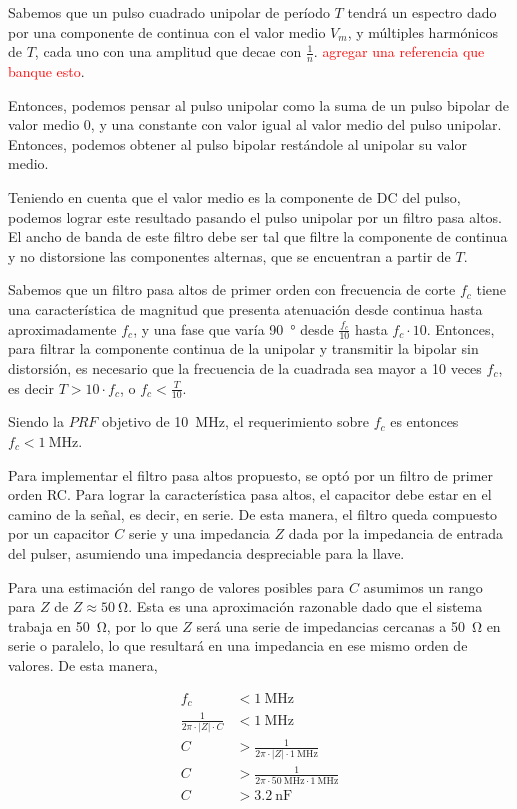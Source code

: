 Sabemos que un pulso cuadrado unipolar de período $T$ tendrá un espectro dado
por una componente de continua con el valor medio $V_{m}$, y múltiples
harmónicos de $T$, cada uno con una amplitud que decae con $\frac{1}{n}$.
\textcolor{red}{agregar una referencia que banque esto}.

Entonces, podemos pensar al pulso unipolar como la suma de un pulso bipolar de
valor medio 0, y una constante con valor igual al valor medio del pulso
unipolar. Entonces, podemos obtener al pulso bipolar restándole al unipolar su
valor medio.

Teniendo en cuenta que el valor medio es la componente de DC del pulso, podemos
lograr este resultado pasando el pulso unipolar por un filtro pasa altos. El ancho
de banda de este filtro debe ser tal que filtre la componente de continua y no
distorsione las componentes alternas, que se encuentran a partir de $T$.

Sabemos que un filtro pasa altos de primer orden con frecuencia de corte $f_c$
tiene una característica de magnitud que presenta atenuación desde continua hasta
aproximadamente $f_c$, y una fase que varía \qty{90}{\degree} desde
$\frac{f_c}{10}$ hasta $f_c \cdot 10$. Entonces, para filtrar la componente
continua de la unipolar y transmitir la bipolar sin distorsión,
es necesario que la frecuencia de la cuadrada sea mayor a 10 veces $f_c$, es
decir $T > 10 \cdot f_c$, o $f_c < \frac{T}{10}$.

Siendo la $PRF$ objetivo de \qty{10}{\mega\hertz}, el requerimiento sobre $f_c$
es entonces $f_c < \qty{1}{\mega\hertz}$.

Para implementar el filtro pasa altos propuesto, se optó por un filtro de primer
orden RC. Para lograr la característica pasa altos, el capacitor debe estar en
el camino de la señal, es decir, en serie. De esta manera, el filtro queda
compuesto por un capacitor $C$ serie y una impedancia $Z$ dada por la impedancia
de entrada del pulser, asumiendo una impedancia despreciable para la llave.

Para una estimación del rango de valores posibles para $C$ asumimos un rango
para $Z$ de $ Z \approx \qty{50}{\ohm}$. Esta es una aproximación razonable dado
que el sistema trabaja en \qty{50}{\ohm}, por lo que $Z$ será una serie de
impedancias cercanas a \qty{50}{\ohm} en serie o paralelo, lo que resultará en
una impedancia en ese mismo orden de valores. De esta manera,

\begin{equation}
    \begin{aligned}
        f_c &< \qty{1}{\mega\hertz} \\
        \frac{1}{2\pi \cdot |Z| \cdot C} &< \qty{1}{\mega\hertz} \\
        C &> \frac{1}{2\pi \cdot |Z| \cdot \qty{1}{\mega\hertz}} \\
        C &> \frac{1}{2\pi \cdot \qty{50}{\mega\hertz} \cdot \qty{1}{\mega\hertz}} \\
        C &> \qty{3.2}{\nano\farad} \\
    \end{aligned}
\end{equation}

